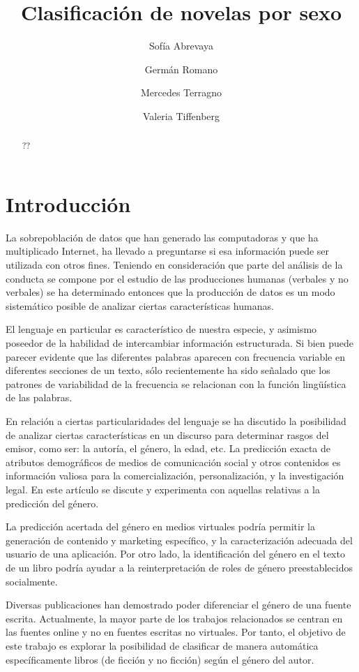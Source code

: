 \documentclass[
journal=jacsat, %
manuscript=article]{achemso}
\author{Sofía Abrevaya}
\affiliation{PSI}
\author{Germán Romano}
\affiliation{FCEN}
\author{Mercedes Terragno}
\affiliation{PSI}
\author{Valeria Tiffenberg}
\affiliation{FCEN}
\title[Clasificación de novelas por sexo]
{Clasificación de novelas por sexo}
\begin{document}
\begin{abstract}
??
\end{abstract}


\section{Introducción}

La sobrepoblación de datos que han generado las computadoras y que ha multiplicado Internet, ha llevado a preguntarse si esa información puede ser utilizada con otros fines. Teniendo en consideración que parte del análisis de la conducta se compone por el estudio de las producciones humanas (verbales y no verbales) se ha determinado entonces que la producción de datos es un modo sistemático posible de analizar ciertas características humanas.

El lenguaje en particular es característico de nuestra especie, y asimismo poseedor de la habilidad de intercambiar información estructurada. Si bien puede parecer evidente que las diferentes palabras aparecen con frecuencia variable en diferentes secciones de un texto, sólo recientemente ha sido señalado que los patrones de variabilidad de la frecuencia se relacionan con la función lingüística de las palabras\cite{montemurro}.

En relación a ciertas particularidades del lenguaje se ha discutido la posibilidad de analizar ciertas características en un discurso para determinar rasgos del emisor, como ser: la autoría, el género, la edad, etc. La predicción exacta de atributos demográficos de medios de comunicación social y otros contenidos es información valiosa para la comercialización, personalización, y la investigación legal\cite{burger}. En este artículo se discute y experimenta con aquellas relativas a la predicción del género.

La predicción acertada del género en medios virtuales podría permitir la generación de contenido y marketing específico, y la caracterización adecuada del usuario de una aplicación. Por otro lado, la identificación del género en el texto de un libro podría ayudar a la reinterpretación de roles de género preestablecidos socialmente.

Diversas publicaciones han demostrado poder diferenciar el género de una fuente escrita.  Actualmente, la mayor parte de los trabajos relacionados se centran en las fuentes online y no en fuentes escritas no virtuales. Por tanto, el objetivo de este trabajo es explorar la posibilidad de clasificar de manera automática específicamente libros (de ficción y no ficción) según el género del autor.
\end{document}
